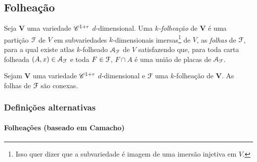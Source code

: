 

\subsection{Folheação}

\begin{definition}
Seja $\bm V$ uma variedade $\mathscr{C}^{1+r}$ $d$-dimensional. Uma \emph{$k$-folheação} de $\bm V$ é uma partição $\mathcal{F}$ de $V$ em subvariedades $k$-dimensionais imersas\footnote{Isso quer dizer que a subvariedade é imagem de uma imersão injetiva em $V$.} de $V$, as \emph{folhas} de $\mathcal{F}$, para a qual existe atlas $k$-folheado $\mathcal{A}_{\mathcal{F}}$ de $V$ satisfazendo que, para toda carta folheada $(A,x) \in \mathcal{A}_{\mathcal{F}}$ e toda $F \in \mathcal{F}$, $F \cap A$ é uma união de placas de $\mathcal{A}_{\mathcal{F}}$.
\end{definition}

\begin{proposition}
Sejam $\bm V$ uma variedade $\mathscr{C}^{1+r}$ $d$-dimensional e $\mathcal{F}$ uma $k$-folheação de $\bm V$. As folhas de $\mathcal{F}$ são conexas.
\end{proposition}



\subsubsection{Definições alternativas}

\paragraph{Folheações (baseado em Camacho)}

